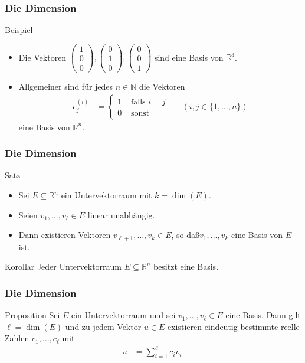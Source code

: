 \documentclass{beamer}
\newcommand\NN{\mathbb N}
\newcommand\RR{\mathbb R}
\renewcommand{\ae}{\"a}
\newcommand{\ue}{\"u}
\newcommand{\mytitle}{Die Dimension}
\begin{document}
\begin{frame}\frametitle{\mytitle}
	\begin{block}{Beispiel}
		\begin{itemize}
			\item Die Vektoren $\begin{pmatrix}1\\0\\0\end{pmatrix},\begin{pmatrix}0\\1\\0\end{pmatrix},\begin{pmatrix}0\\0\\1\end{pmatrix}$ sind eine Basis von $\RR^3$.
			\item Allgemeiner sind f\ue r jedes $n\in\NN$ die Vektoren
				\begin{align*}
					e^{(i)}_j&=\begin{cases}
						1&\mbox{ falls }i=j\\0&\mbox{ sonst}
					\end{cases}&&(i,j\in\{1,\ldots,n\})
				\end{align*}
				eine Basis von $\RR^n$.
		\end{itemize}
	\end{block}
\end{frame}

\begin{frame}\frametitle{\mytitle}
	\begin{block}{Satz}
		\begin{itemize}
			\item Sei $E\subseteq\RR^n$ ein Untervektorraum mit $k=\dim(E)$.
			\item Seien $v_1,\ldots,v_\ell\in E$ linear unabh\ae ngig.
			\item Dann existieren Vektoren $v_{\ell+1},\ldots,v_k\in E$, so da\ss $v_1,\ldots,v_k$ eine Basis von $E$ ist.
		\end{itemize}
	\end{block}
\begin{block}{Korollar}
	Jeder Untervektorraum $E\subseteq\RR^n$ besitzt eine Basis.
	\end{block}
\end{frame}

\begin{frame}\frametitle{\mytitle}
	\begin{block}{Proposition}
		Sei $E$ ein Untervektorraum und sei $v_1,\ldots,v_\ell\in E$ eine Basis.
		Dann gilt $\ell=\dim(E)$ und zu jedem Vektor $u\in E$ existieren eindeutig bestimmte reelle Zahlen $c_1,\ldots,c_\ell$ mit
		\begin{align*}
			u&=\sum_{i=1}^\ell c_iv_i.
		\end{align*}
	\end{block}
\end{frame}
\end{document}
